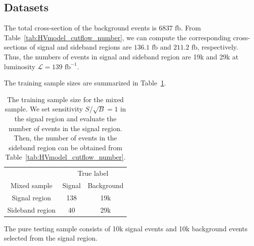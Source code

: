 \documentclass[12pt]{article}
\begin{document}
	\subsection{Datasets}%
	\label{sub:datasets}
		The total cross-section of the background events is $6837 \text{ fb}$. From Table~\ref{tab:HVmodel_cutflow_number}, we can compute the corresponding cross-sections of signal and sideband regions are $136.1 \text{ fb}$ and $211.2 \text{ fb}$, respectively. Thus, the numbers of events in signal and sideband region are 19k and 29k at luminosity $\mathcal{L} = 139 \text{ fb}^{-1}$.

		The training sample sizes are summarized in Table~\ref{tab:training_sample_size_cwola_hunting_hv}.
		\begin{table}[htpb]
			\centering
			\caption{The training sample size for the mixed sample. We set sensitivity $S / \sqrt{B} = 1$ in the signal region and evaluate the number of events in the signal region. Then, the number of events in the sideband region can be obtained from Table~\ref{tab:HVmodel_cutflow_number}.}
			\label{tab:training_sample_size_cwola_hunting_hv}
			\begin{tabular}{c|cc}
								& \multicolumn{2}{c}{True label} \\
				Mixed sample    & Signal       & Background      \\ \hline
				Signal region   & 138          & 19k             \\
				Sideband region & 40           & 29k
			\end{tabular}
		\end{table}	

		The pure testing sample consists of 10k signal events and 10k background events selected from the signal region.
\end{document}
